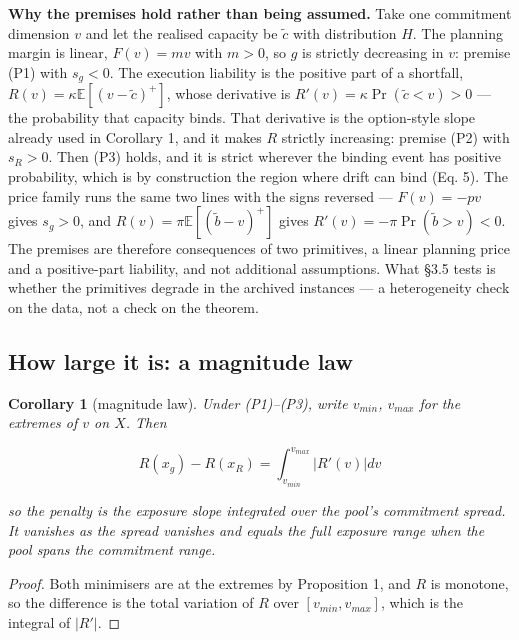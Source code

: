 \documentclass[preprint,12pt,letterpaper]{elsarticle}
\theoremstyle{definition}
\theoremstyle{plain}
\newtheorem{corollary}{Corollary}
\begin{document}
\textbf{Why the premises hold rather than being assumed.} Take one commitment dimension $v$ and let the realised capacity be $\tilde{c}$ with distribution $H$. The planning margin is linear, $F(v) = m v$ with $m > 0$, so $g$ is strictly decreasing in $v$: premise (P1) with $s_{g} < 0$. The execution liability is the positive part of a shortfall, $R(v) = \kappa \mathbb{E}[(v - \tilde{c})^{+}]$, whose derivative is $R'(v) = \kappa \Pr (\tilde{c} < v) > 0$ --- the probability that capacity binds. That derivative is the option-style slope already used in Corollary 1, and it makes $R$ strictly increasing: premise (P2) with $s_{R} > 0$. Then (P3) holds, and it is strict wherever the binding event has positive probability, which is by construction the region where drift can bind (Eq. 5). The price family runs the same two lines with the signs reversed --- $F(v) = -p v$ gives $s_{g} > 0$, and $R(v) = \pi \mathbb{E}[(\tilde{b} - v)^{+}]$ gives $R'(v) = -\pi \Pr (\tilde{b} > v) < 0$. The premises are therefore consequences of two primitives, a linear planning price and a positive-part liability, and not additional assumptions. What \S 3.5 tests is whether the primitives degrade in the archived instances --- a heterogeneity check on the data, not a check on the theorem.

\subsection{How large it is: a magnitude law}

\begin{corollary}[magnitude law]
Under (P1)--(P3), write $v_{min}$, $v_{max}$ for the extremes of $v$ on $X$. Then

\begin{equation}
\tag{6}
R(x_{g}) - R(x_{R}) = \int_{v_{min}}^{v_{max}} |R'(v)| dv
\end{equation}

so the penalty is the exposure slope integrated over the pool's commitment spread. It vanishes as the spread vanishes and equals the full exposure range when the pool spans the commitment range.
\end{corollary}

\begin{proof}
Both minimisers are at the extremes by Proposition 1, and $R$ is monotone, so the difference is the total variation of $R$ over $[v_{min}, v_{max}]$, which is the integral of $|R'|$.
\end{proof}
\end{document}

